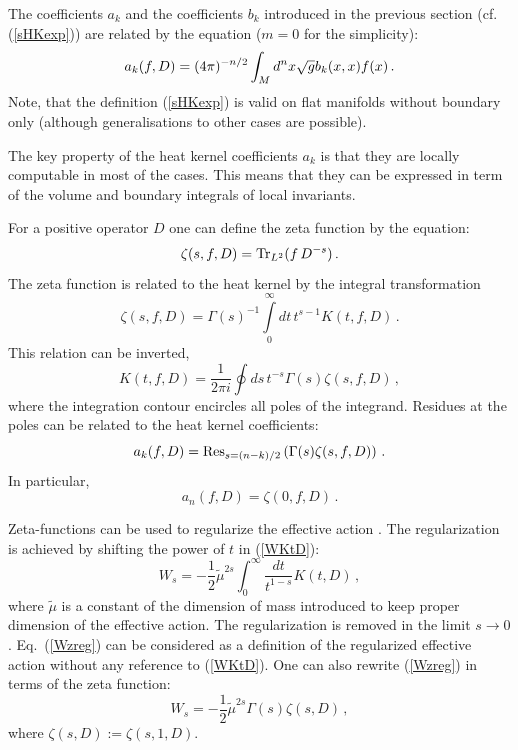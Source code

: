 The coefficients $a_k$ and the coefficients $b_k$ introduced in the
previous section (cf. (\ref{sHKexp})) are related by the equation
($m=0$ for the simplicity):
\begin{equation}
a_k(f,D)=(4\pi )^{-n/2} \int_M d^nx\sqrt{g} b_k(x,x)f(x) \,.\label{akbk}
\end{equation}
Note, that the definition (\ref{sHKexp}) is valid on flat manifolds
without boundary only (although generalisations to other cases
are possible).

The key property of the heat kernel coefficients $a_k$ is that
they are locally computable in most of the cases. This means that
they can be expressed in term of the volume and boundary integrals
of local invariants. 

For a positive operator $D$ one can define the zeta function
\cite{Mina,Seeley:1968}
by the equation:
\begin{equation}
\zeta (s,f,D)= {\rm Tr}_{L^2} (f\, D^{-s}) \,.\label{defzeta}
\end{equation}
The zeta function is related to the heat kernel by the integral
transformation
\begin{equation}
\zeta (s,f,D)=\Gamma (s)^{-1}\int\limits_0^\infty dt\, t^{s-1}
K(t,f,D) \,.\label{zetaheat}
\end{equation}
This relation can be inverted,
\begin{equation}
K(t,f,D)=\frac 1{2\pi i}\oint ds\, t^{-s}\Gamma(s)\zeta (s,f,D)\,,
\label{heatzeta}
\end{equation}
where the integration contour encircles all poles of the integrand.
Residues at the poles can be related to the heat kernel coefficients:
\begin{equation}
a_k(f,D)={\rm Res}_{s=(n-k)/2} \left( \Gamma(s)\zeta (s,f,D) \right)\,.
\label{aRes}
\end{equation}
In particular,
\begin{equation}
a_n(f,D)= \zeta (0,f,D) \,.\label{anz0}
\end{equation}

Zeta-functions can be used to regularize the effective action
\cite{Dowker:1976tf,Hawking:1977ja}. The regularization is achieved
by shifting the power of $t$ in (\ref{WKtD}):
\begin{equation}
W_s=-\frac 12 \tilde\mu^{2s}\int_0^\infty \frac {dt}{t^{1-s}} 
K(t,D) \,,\label{Wzreg}
\end{equation}
where $\tilde\mu$ is a constant of the dimension of mass introduced to keep
proper dimension of the effective action. The regularization is removed
in the limit $s\to 0$. Eq.\ (\ref{Wzreg}) can be considered as a
definition of the regularized effective action without any reference to (\ref{WKtD}).
One can also rewrite (\ref{Wzreg}) in terms of the zeta function:
\begin{equation}
W_s=-\frac 12 \tilde\mu^{2s} \Gamma(s)\zeta (s,D) \,,
\label{WzGam}
\end{equation}  
where $\zeta (s,D):=\zeta (s,1,D)$.

